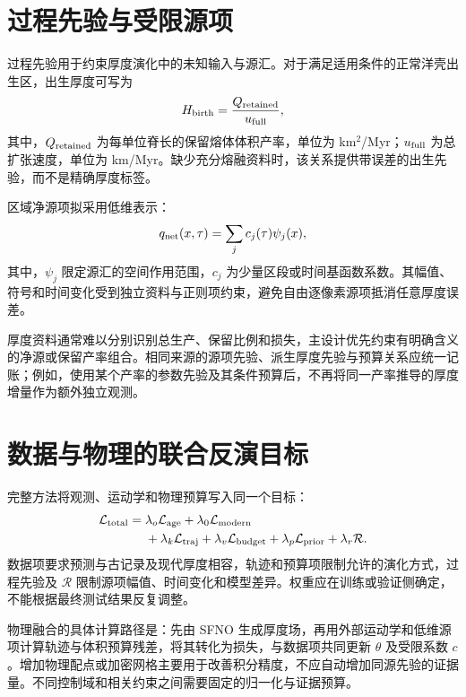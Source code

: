\documentclass[UTF8,zihao=-4,fontset=none,a4paper]{ctexart}
\newcommand{\loss}{\mathcal{L}}
\begin{document}
\section{过程先验与受限源项}

过程先验用于约束厚度演化中的未知输入与源汇。对于满足适用条件的正常洋壳出生区，出生厚度可写为
\begin{equation}
  H_{\rm birth}=\frac{Q_{\rm retained}}{u_{\rm full}},
  \label{eq:ridge}
\end{equation}
其中，$Q_{\rm retained}$ 为每单位脊长的保留熔体体积产率，单位为 km$^2$/Myr；$u_{\rm full}$ 为总扩张速度，单位为 km/Myr。缺少充分熔融资料时，该关系提供带误差的出生先验，而不是精确厚度标签。

区域净源项拟采用低维表示：
\begin{equation}
  q_{\rm net}(x,\tau)=\sum_j c_j(\tau)\psi_j(x),
  \label{eq:source}
\end{equation}
其中，$\psi_j$ 限定源汇的空间作用范围，$c_j$ 为少量区段或时间基函数系数。其幅值、符号和时间变化受到独立资料与正则项约束，避免自由逐像素源项抵消任意厚度误差。

厚度资料通常难以分别识别总生产、保留比例和损失，主设计优先约束有明确含义的净源或保留产率组合。相同来源的源项先验、派生厚度先验与预算关系应统一记账；例如，使用某个产率的参数先验及其条件预算后，不再将同一产率推导的厚度增量作为额外独立观测。

\section{数据与物理的联合反演目标}

完整方法将观测、运动学和物理预算写入同一个目标：
\begin{equation}
  \begin{aligned}
  \loss_{\rm total}={}&
  \lambda_o\loss_{\rm age}
  +\lambda_0\loss_{\rm modern}\\
  &+\lambda_k\loss_{\rm traj}
  +\lambda_v\loss_{\rm budget}
  +\lambda_p\loss_{\rm prior}
  +\lambda_r\mathcal R.
  \end{aligned}
  \label{eq:joint}
\end{equation}
数据项要求预测与古记录及现代厚度相容，轨迹和预算项限制允许的演化方式，过程先验及 $\mathcal R$ 限制源项幅值、时间变化和模型差异。权重应在训练或验证侧确定，不能根据最终测试结果反复调整。

物理融合的具体计算路径是：先由 SFNO 生成厚度场，再用外部运动学和低维源项计算轨迹与体积预算残差，将其转化为损失，与数据项共同更新 $\theta$ 及受限系数 $c$。增加物理配点或加密网格主要用于改善积分精度，不应自动增加同源先验的证据量。不同控制域和相关约束之间需要固定的归一化与证据预算。
\end{document}
